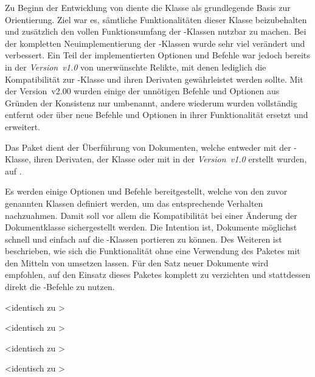 \begin{DeclareEntity}{}
Zu Beginn der Entwicklung von \TUDScript diente die Klasse  als 
grundlegende Basis zur Orientierung. Ziel war es, sämtliche Funktionalitäten 
dieser Klasse beizubehalten und zusätzlich den vollen Funktionsumfang der 
\KOMAScript-Klassen nutzbar zu machen. Bei der kompletten Neuimplementierung 
der \TUDScript-Klassen wurde sehr viel verändert und verbessert. Ein Teil der 
implementierten Optionen und Befehle war jedoch bereits in der 
\emph{Version~v1.0} von \TUDScript unerwünschte Relikte, mit denen lediglich 
die Kompatibilität zur -Klasse und ihren Derivaten 
gewährleistet werden sollte. Mit der Version~v2.00 wurden einige der unnötigen 
Befehle und Optionen aus Gründen der Konsistenz nur umbenannt, andere wiederum 
wurden vollständig entfernt oder über neue Befehle und Optionen in ihrer 
Funktionalität ersetzt und erweitert. 

Das Paket  dient der Überführung von Dokumenten, welche
entweder mit der -Klasse, ihren Derivaten, 
der Klasse  oder mit \TUDScript in der \emph{Version~v1.0} 
erstellt wurden, auf \vTUDScript{\TUDScript}. 

Es werden einige Optionen und Befehle bereitgestellt, welche von den zuvor 
genannten Klassen definiert werden, um das entsprechende Verhalten nachzuahmen. 
Damit soll vor allem die Kompatibilität bei einer Änderung der Dokumentklasse 
sichergestellt werden. Die Intention ist, Dokumente möglichst schnell und 
einfach auf die \TUDScript-Klassen portieren zu können. Des Weiteren ist 
beschrieben, wie sich die Funktionalität ohne eine Verwendung des Paketes 
 mit den Mitteln von \TUDScript umsetzen lassen. Für den 
Satz neuer Dokumente wird empfohlen, auf den Einsatz dieses Paketes komplett zu 
verzichten und stattdessen direkt die \TUDScript-Befehle zu nutzen.

\begin{Declaration}
  {}
  <identisch zu >
\begin{Declaration}
  {}
  <identisch zu >
\begin{Declaration}
  {}
  <identisch zu >
\begin{Declaration}
  {}
  <identisch zu >
\printdeclarationlist


\end{Declaration}
\end{Declaration}
\end{Declaration}
\end{Declaration}
\end{DeclareEntity}
